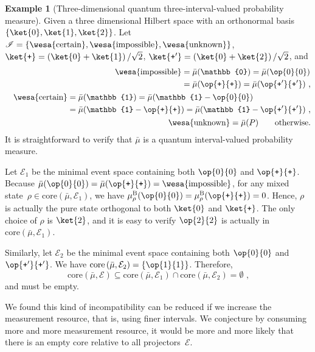 \documentclass[english,reprint, aps, prl,superscriptaddress, showpacs,
showkeys, longbibliography, amsmath, amssymb]{revtex4-1}
\theoremstyle{plain}
\theoremstyle{definition}
\newtheorem{example}[thm]{Example}
\newcommand{\events}{\ensuremath{\mathcal{E}}}
\newcommand{\imposs}{{\text{\wesa{impossible}}}}
\newcommand{\necess}{{\text{\wesa{certain}}}}
\newcommand{\unknown}{{\text{\wesa{unknown}}}}
\newcommand{\proj}[1]{\op{#1}{#1}}
\newcommand{\ps}{\texttt{+}}
\begin{document}
\begin{example}[Three-dimensional quantum three-interval-valued probability
measure]\label{ex:three-dimensional-three-value} Given a three dimensional
Hilbert space with an orthonormal basis $\left\{ \ket{0},\ket{1},\ket{2}\right\} $.
Let $\mathscr{I}=\left\{ \necess,\imposs,\unknown\right\} $, $\ket{\ps}=\left(\ket{0}+\ket{1}\right)/\sqrt{2}$,
$\ket{\ps'}=\left(\ket{0}+\ket{2}\right)/\sqrt{2}$, and
\begin{eqnarray}
 &  & \begin{aligned}\imposs & =\bar{\mu}(\mathbb{0})=\bar{\mu}(\proj{0})\\
 & =\bar{\mu}(\proj{\ps})=\bar{\mu}(\proj{\ps'})\textrm{ ,}
\end{aligned}
\\
 &  & \begin{aligned}\necess & =\bar{\mu}(\mathbb{1})=\bar{\mu}(\mathbb{1}-\proj{0})\\
 & =\bar{\mu}(\mathbb{1}-\proj{\ps})=\bar{\mu}(\mathbb{1}-\proj{\ps'})\textrm{ ,}
\end{aligned}
\\
 &  & \unknown=\bar{\mu}(P)\qquad\textrm{otherwise.}
\end{eqnarray}
It is straightforward to verify that $\bar{\mu}$ is a quantum interval-valued
probability measure. 

Let $\events_{1}$ be the minimal event space containing both $\proj{0}$
and $\proj{\ps}$. Because $\bar{\mu}(\proj{0})=\bar{\mu}(\proj{\ps})=\imposs$,
for any mixed state~$\rho\in\mathrm{core}\left(\bar{\mu},\events_{1}\right)$,
we have $\mu_{\rho}^{\mathrm{B}}(\proj{0})=\mu_{\rho}^{\mathrm{B}}(\proj{\ps})=0$.
Hence, $\rho$ is actually the pure state orthogonal to both $\ket{0}$
and $\ket{\ps}$. The only choice of $\rho$ is $\ket{2}$, and it
is easy to verify $\proj{2}$ is actually in $\mathrm{core}\left(\bar{\mu},\events_{1}\right)$.

Similarly, let $\events_{2}$ be the minimal event space containing
both $\proj{0}$ and $\proj{\ps'}$. We have $\mathrm{core}\left(\bar{\mu},\events_{2}\right)=\left\{ \proj{1}\right\} $.
Therefore, 
\begin{equation}
\mathrm{core}\left(\bar{\mu},\events\right)\subseteq\mathrm{core}\left(\bar{\mu},\events_{1}\right)\cap\mathrm{core}\left(\bar{\mu},\events_{2}\right)=\emptyset\textrm{ ,}
\end{equation}
and must be empty.\end{example}

We found this kind of incompatibility can be reduced if we increase
the measurement resource, that is, using finer intervals. We conjecture
by consuming more and more measurement resource, it would be more
and more likely that there is an empty core relative to all projectors~$\events$.


\end{document}
